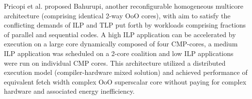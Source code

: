 \documentclass[a4paper,12pt, final]{report}
\begin{document}
\indent Pricopi et al. \cite{pricopi2012bahurupi} proposed Bahurupi, another reconfigurable homogeneous multicore architecture (comprising identical 2-way OoO cores), with aim to satisfy the conflicting demands of ILP and TLP put forth by workloads comprising fractions of parallel and sequential codes. A high ILP application can be accelerated by execution on a large core dynamically composed of four CMP-cores, a medium ILP application was scheduled on a 2-core coalition and low ILP applications were run on individual CMP cores. This architecture utilized a distributed execution model (compiler-hardware mixed solution) and achieved performance of equivalent fetch width complex OoO superscalar core without paying for complex hardware and associated energy inefficiency. %
\end{document}
